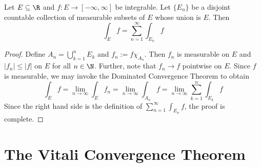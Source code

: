 \begin{theorem}
    Let $E\subseteq\R$ and $f: E\to[-\infty,\infty]$ be integrable. Let $\{E_n\}$ be a disjoint countable collection of measurable subsets of $E$ whose union is $E$. Then 
    \begin{equation*}
        \int_E f = \sum_{n = 1}^\infty\int_{E_n} f
    \end{equation*}
\end{theorem}
\begin{proof}
    Define $A_n = \bigcup_{k = 1}^n E_k$ and $f_n := f\chi_{A_n}$. Then $f_n$ is measurable on $E$ and $|f_n|\le|f|$ on $E$ for all $n\in\N$. Further, note that $f_n\to f$ pointwise on $E$. Since $f$ is measurable, we may invoke the Dominated Convergence Theorem to obtain 
    \begin{equation*}
        \int_E f = \lim_{n\to\infty}\int_E f_n = \lim_{n\to\infty}\int_{A_n} f = \lim_{n\to\infty}\sum_{k = 1}^n\int_{E_k} f
    \end{equation*}
    Since the right hand side is the definition of $\sum\limits_{n = 1}^\infty\int_{E_n} f$, the proof is complete.
\end{proof}

\begin{theorem}
    
\end{theorem}

\section{The Vitali Convergence Theorem}

